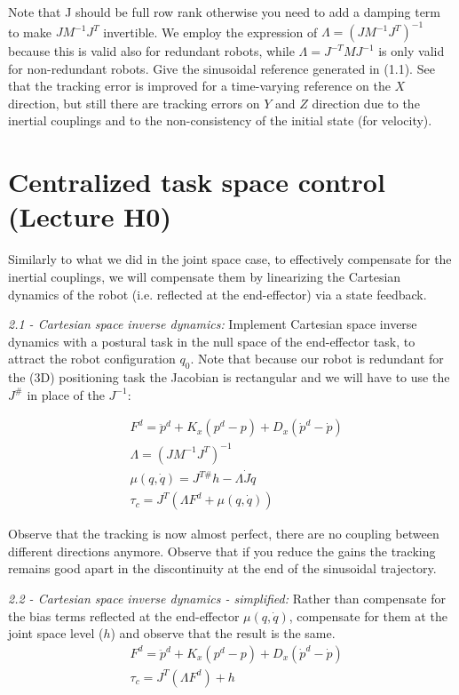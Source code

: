 \documentclass[11pt]{article}
\begin{document}
Note that J should be full row rank  otherwise you need to add a damping term to make $JM^{-1}J^T$ invertible.
We employ the expression of $\Lambda = (JM^{-1}J^T)^{-1}$ because this is valid also for redundant robots, while $\Lambda = J^{-T}M J^{-1}$ is only  valid for non-redundant robots. 
Give the sinusoidal reference generated in (1.1). See that the tracking error is improved for a time-varying reference on the $X$ direction, but still there are tracking errors on $Y$ and $Z$ direction due to the inertial couplings and to the non-consistency of the initial state (for velocity).

\section{Centralized task space control (Lecture H0)}

Similarly to what we did in the joint space case, to effectively compensate for the inertial couplings, we will compensate them by linearizing the Cartesian dynamics of the robot (i.e. reflected at the end-effector) via a state feedback.

\quad

\noindent
\textit{2.1 - Cartesian space inverse dynamics:}
Implement Cartesian space inverse dynamics with a postural task in the null space of the end-effector task, to attract the robot configuration $q_0$. 
Note that because our robot is redundant for the (3D) positioning task the Jacobian is rectangular and we will have to use the $J^{\#}$ in place of the $J^{-1}$:

\begin{align}
&F^d = \ddot{p}^d + K_x(p^d - p) + D_x(\dot{p}^d -\dot{p})  \\
& \Lambda = (J M^{-1}J^T)^{-1}\\
&\mu(q,\dot{q})  = J^{T\#} h -\Lambda \dot{J} \dot{q} \\
&\tau_c  = J^T\left( \Lambda F^d +  \mu(q,\dot{q}) \right)
\end{align}


Observe that the tracking is now almost perfect, there are no coupling between different directions anymore.  Observe that if you reduce the gains the tracking remains good apart in the discontinuity at the end of the sinusoidal trajectory.  


\quad

\noindent
\textit{2.2 - Cartesian space inverse dynamics - simplified:}
Rather than compensate for the bias terms reflected at the end-effector $\mu(q,\dot{q})$,  compensate for them at the joint space level ($h$) and observe that the result is the same. 
\begin{align}
&F^d = \ddot{p}^d + K_x(p^d - p) + D_x(\dot{p}^d -\dot{p})  \\
&\tau_c  = J^T\left( \Lambda F^d  \right) + h
\end{align}
\end{document}
